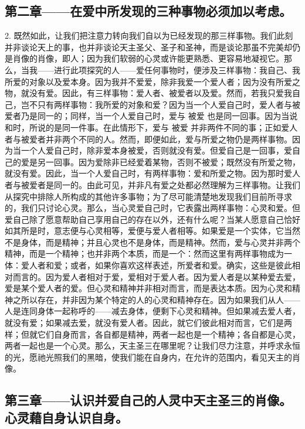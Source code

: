 \subsection{第二章——在爱中所发现的三种事物必须加以考虑。}

2. 既然如此，让我们把注意力转向我们自以为已经发现的那三样事物。我们此刻并非谈论天上的事，也并非谈论天主圣父、圣子和圣神，而是谈论那虽不完美却仍是肖像的肖像，即人；因为我们软弱的心灵或许能更熟悉、更容易地凝视它。那么，当我——进行此项探究的人——爱任何事物时，便涉及三样事物：我自己、我所爱的对象以及爱本身。因为我并不爱爱，除非我爱一个爱人者；因为没有所爱之物，就没有爱。因此，有三样事物：爱人者、被爱者以及爱。然而，若我只爱我自己，岂不只有两样事物：我所爱的对象和爱？因为当一个人爱自己时，爱人者与被爱者乃是同一的；同样，当一个人爱自己时，爱与 被爱 也是同一回事。因为当说和时，所说的是同一件事。在此情形下，爱与 被爱 并非两件不同的事；正如爱人者与被爱者并非两个不同的人。然而，即便如此，爱与所爱之物仍是两样事物。因为当一个人爱自己时，除非爱本身被爱，否则就没有爱。但爱自己是一回事，爱自己的爱是另一回事。因为爱除非已经爱着某物，否则不被爱；既然没有所爱之物，就没有爱。因此，当一个人爱自己时，有两样事物：爱和所爱之物。因为那时爱人者与被爱者是同一的。由此可见，并非凡有爱之处都必然理解为三样事物。让我们从探究中排除人所构成的其他许多事物；为了尽可能清楚地发现我们目前所寻求的，我们只讨论心灵。那么，当心灵爱自己时，它表露出两样事物：心灵和爱。但爱自己除了愿意帮助自己享用自己的存在以外，还有什么呢？当某人愿意自己恰好如其所是时，意志便与心灵相等，爱便与爱人者相等。如果爱是一个实体，它当然不是身体，而是精神；并且心灵也不是身体，而是精神。然而，爱与心灵并非两个精神，而是一个精神；也并非两个本质，而是一个：然而这里有两样事物成为一体：爱人者和爱；或者，如果你喜欢这样表述，所爱者和爱。确实，这些是彼此相对而言的。因为爱人者相对于爱，爱相对于爱人者。因为爱人者是以某种爱去爱，爱是某个爱人者的爱。但心灵和精神并非相对而言，而是表达本质。因为心灵和精神之所以存在，并非因为某个特定的人的心灵和精神存在。因为如果我们从人——人是连同身体一起称呼的——减去身体，便剩下心灵和精神。但如果减去爱人者，就没有爱；如果减去爱，就没有爱人者。因此，就它们彼此相对而言，它们是两样；但就它们自身而言，各自都是精神，两者一起也是一个精神；各自都是心灵，两者一起也是一个心灵。那么，天主圣三在哪里呢？让我们尽力注意，并呼求永恒的光，愿祂光照我们的黑暗，使我们能在自身内，在允许的范围内，看见天主的肖像。\par


\subsection{第三章——认识并爱自己的人灵中天主圣三的肖像。心灵藉自身认识自身。}

